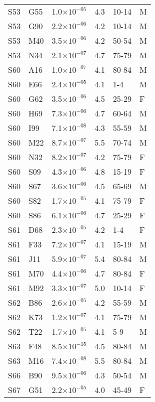 \begin{longtable}{lllrll}
   S53 & G55 & 1.0$\times10^{-05}$ & 4.3 & 10-14 & M \\ 
   S53 & G90 & 2.2$\times10^{-06}$ & 4.2 & 10-14 & M \\ 
   S53 & M40 & 3.5$\times10^{-06}$ & 4.2 & 50-54 & M \\ 
   S53 & N34 & 2.1$\times10^{-07}$ & 4.7 & 75-79 & M \\ 
   S60 & A16 & 1.0$\times10^{-07}$ & 4.1 & 80-84 & M \\ 
   S60 & E66 & 2.4$\times10^{-05}$ & 4.1 & 1-4 & M \\ 
   S60 & G62 & 3.5$\times10^{-06}$ & 4.5 & 25-29 & F \\ 
   S60 & H69 & 7.3$\times10^{-06}$ & 4.7 & 60-64 & M \\ 
   S60 & I99 & 7.1$\times10^{-08}$ & 4.3 & 55-59 & M \\ 
   S60 & M22 & 8.7$\times10^{-07}$ & 5.5 & 70-74 & M \\ 
   S60 & N32 & 8.2$\times10^{-07}$ & 4.2 & 75-79 & F \\ 
   S60 & S09 & 4.3$\times10^{-06}$ & 4.8 & 15-19 & F \\ 
   S60 & S67 & 3.6$\times10^{-06}$ & 4.5 & 65-69 & M \\ 
   S60 & S82 & 1.7$\times10^{-05}$ & 4.1 & 75-79 & F \\ 
   S60 & S86 & 6.1$\times10^{-06}$ & 4.7 & 25-29 & F \\ 
   S61 & D68 & 2.3$\times10^{-05}$ & 4.2 & 1-4 & F \\ 
   S61 & F33 & 7.2$\times10^{-07}$ & 4.1 & 15-19 & M \\ 
   S61 & J11 & 5.9$\times10^{-07}$ & 5.4 & 80-84 & M \\ 
   S61 & M70 & 4.4$\times10^{-06}$ & 4.7 & 80-84 & F \\ 
   S61 & M92 & 3.3$\times10^{-07}$ & 5.0 & 10-14 & F \\ 
   S62 & B86 & 2.6$\times10^{-05}$ & 4.2 & 55-59 & M \\ 
   S62 & K73 & 1.2$\times10^{-07}$ & 4.1 & 75-79 & M \\ 
   S62 & T22 & 1.7$\times10^{-05}$ & 4.1 & 5-9 & M \\ 
   S63 & F48 & 8.5$\times10^{-15}$ & 4.5 & 80-84 & M \\ 
   S63 & M16 & 7.4$\times10^{-08}$ & 5.5 & 80-84 & M \\ 
   S66 & B90 & 9.5$\times10^{-06}$ & 4.3 & 50-54 & M \\ 
   S67 & G51 & 2.2$\times10^{-05}$ & 4.0 & 45-49 & F \\ 

\end{longtable}
